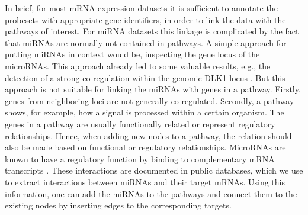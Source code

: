 \documentclass{bioinfo}
\begin{document}
In brief, for most mRNA expression datasets it is sufficient to annotate the probesets with appropriate
gene identifiers, in order to link the data with the pathways of interest. For miRNA datasets this linkage
is complicated by the fact that miRNAs are normally not contained in pathways.
A simple approach for putting miRNAs in context would be, inspecting the gene locus of the microRNAs. This approach already led to some valuable results, e.g., the detection of a strong co-regulation within the genomic DLK1 locus \citep{DLK1miRNA}. But this approach is not suitable for linking the miRNAs with genes in a pathway. Firstly, genes from neighboring loci are not generally co-regulated. Secondly, a pathway shows, for example, how a signal is processed within a certain organism. The genes in a pathway are usually functionally related or represent regulatory relationships. Hence, when adding new nodes to a pathway, the relation should also be made based on functional or regulatory relationships. MicroRNAs are known to have a regulatory function by binding to complementary mRNA transcripts \citep{Bartel2004}. These interactions are documented in public databases, which we use to extract interactions between miRNAs and their target mRNAs. Using this information, one can add the miRNAs to the pathways and connect them to the existing nodes by inserting edges to the corresponding targets.
\end{document}
